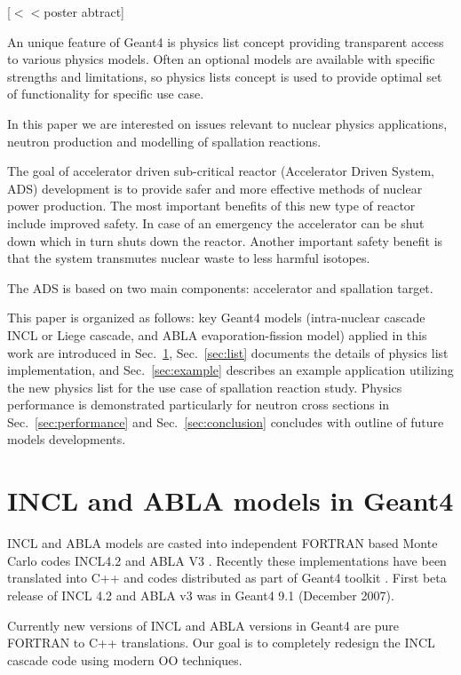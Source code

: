 \documentclass[a4paper]{jpconf}
\begin{document}
[$<<$poster abtract]


An unique feature of Geant4 is physics list concept providing transparent access 
to various physics models. 
Often an optional models are available with specific strengths and limitations, 
so physics lists concept is used to
provide optimal set of functionality for specific use case.

In this paper we are interested on issues relevant to nuclear physics applications,
neutron production and modelling of spallation reactions.  


The goal of accelerator driven sub-critical reactor (Accelerator
Driven System, ADS) development is to provide safer and more effective
methods of nuclear power production. The most important benefits of
this new type of reactor include improved safety. In case of an
emergency the accelerator can be shut down which in turn shuts down
the reactor. Another important safety benefit is that the system
transmutes nuclear waste to less harmful isotopes.

The ADS is based on two main components: accelerator and spallation target.

This paper is organized as follows:
key Geant4 models (intra-nuclear cascade INCL or Liege cascade, and ABLA evaporation-fission model) 
applied in this work are introduced in Sec.~\ref{sec:models},
Sec.~\ref{sec:list} documents the details of physics list implementation, and
Sec.~\ref{sec:example} describes an example application utilizing the new physics list
for the use case of spallation reaction study.
Physics performance is demonstrated particularly for 
neutron  cross sections in Sec.~\ref{sec:performance} and
Sec.~\ref{sec:conclusion} concludes with outline of future models developments.


\section{INCL and ABLA models in Geant4} \label{sec:models}

INCL and ABLA models are casted into independent FORTRAN based Monte Carlo codes 
INCL4.2 and ABLA V3 \cite{heikkinen07mProceedings}.
Recently these implementations have been translated into C++ and codes distributed
as part of Geant4 toolkit \cite{heikkinen03aPaper}. 
First beta release of INCL 4.2 and ABLA v3 was in Geant4  9.1 (December 2007).

Currently new versions of INCL and ABLA versions in Geant4 are pure
FORTRAN to C++ translations. Our goal is to completely redesign the
INCL cascade code using modern OO techniques.
\end{document}
